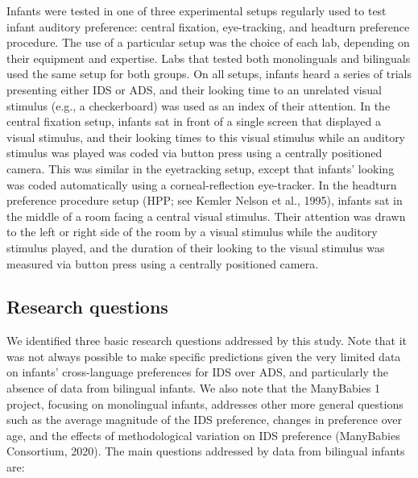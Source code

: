 \documentclass[
  english,
  ,man,floatsintext]{apa6}
\begin{document}
Infants were tested in one of three experimental setups regularly used to test infant auditory preference: central fixation, eye-tracking, and headturn preference procedure. The use of a particular setup was the choice of each lab, depending on their equipment and expertise. Labs that tested both monolinguals and bilinguals used the same setup for both groups. On all setups, infants heard a series of trials presenting either IDS or ADS, and their looking time to an unrelated visual stimulus (e.g., a checkerboard) was used as an index of their attention. In the central fixation setup, infants sat in front of a single screen that displayed a visual stimulus, and their looking times to this visual stimulus while an auditory stimulus was played was coded via button press using a centrally positioned camera. This was similar in the eyetracking setup, except that infants' looking was coded automatically using a corneal-reflection eye-tracker. In the headturn preference procedure setup (HPP; see Kemler Nelson et al., 1995), infants sat in the middle of a room facing a central visual stimulus. Their attention was drawn to the left or right side of the room by a visual stimulus while the auditory stimulus played, and the duration of their looking to the visual stimulus was measured via button press using a centrally positioned camera.

\hypertarget{research-questions}{%
\subsection{Research questions}\label{research-questions}}

We identified three basic research questions addressed by this study. Note that it was not always possible to make specific predictions given the very limited data on infants' cross-language preferences for IDS over ADS, and particularly the absence of data from bilingual infants. We also note that the ManyBabies 1 project, focusing on monolingual infants, addresses other more general questions such as the average magnitude of the IDS preference, changes in preference over age, and the effects of methodological variation on IDS preference (ManyBabies Consortium, 2020). The main questions addressed by data from bilingual infants are:
\end{document}
